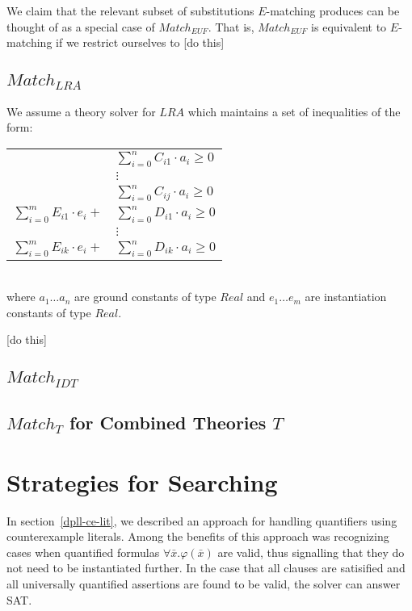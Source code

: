 \documentclass{llncs}
\begin{document}
We claim that the relevant subset of substitutions $E$-matching produces can be thought of as a special case of $Match_{EUF}$.
That is, $Match_{EUF}$ is equivalent to $E$-matching if we restrict ourselves to
[do this]

\subsection{$Match_{LRA}$}

We assume a theory solver for $LRA$ which maintains a set of inequalities of the form:

\begin{tabular}{rl}
 & $\displaystyle\sum\limits_{i=0}^n C_{i1} \cdot a_i \geq 0$ \\
 & $\vdots$ \\
 & $\displaystyle\sum\limits_{i=0}^n C_{ij} \cdot a_i \geq 0$ \\
 $\displaystyle\sum\limits_{i=0}^m E_{i1} \cdot e_i +$ & $\displaystyle\sum\limits_{i=0}^n D_{i1} \cdot a_i \geq 0$ \\
 & $\vdots$ \\
 $\displaystyle\sum\limits_{i=0}^m E_{ik} \cdot e_i +$ & $\displaystyle\sum\limits_{i=0}^n D_{ik} \cdot a_i \geq 0$ \\
 \end{tabular} \\

where $a_1 \ldots a_n$ are ground constants of type $Real$ and $e_1 \ldots e_m$ are instantiation constants of type $Real$.

[do this]

\subsection{$Match_{IDT}$}

\subsection{$Match_{T}$ for Combined Theories $T$}

\section{Strategies for Searching}

In section~\ref{dpll-ce-lit}, we described an approach for handling quantifiers using counterexample literals.
Among the benefits of this approach was recognizing cases when quantified formulas $\forall \bar{x}. \varphi( \bar{x} )$ are valid, thus signalling that they do not need to be instantiated further.
In the case that all clauses are satisified and all universally quantified assertions are found to be valid, the solver can answer SAT.
\end{document}
